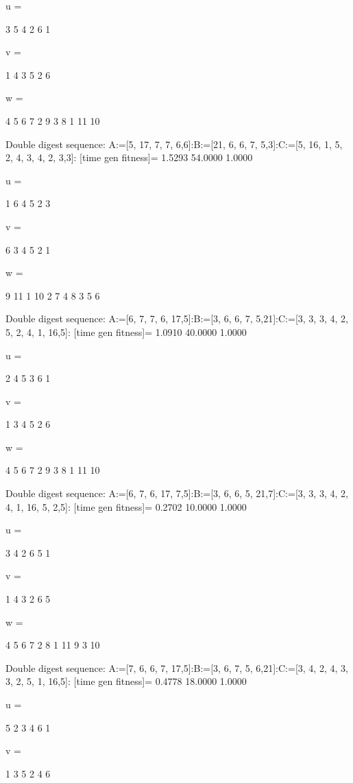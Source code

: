 u =

     3     5     4     2     6     1


v =

     1     4     3     5     2     6


w =

     4     5     6     7     2     9     3     8     1    11    10

Double digest sequence:
A:=[5, 17, 7, 7, 6,6]:B:=[21, 6, 6, 7, 5,3]:C:=[5, 16, 1, 5, 2, 4, 3, 4, 2, 3,3]:
[time gen fitness]=
    1.5293   54.0000    1.0000


u =

     1     6     4     5     2     3


v =

     6     3     4     5     2     1


w =

     9    11     1    10     2     7     4     8     3     5     6

Double digest sequence:
A:=[6, 7, 7, 6, 17,5]:B:=[3, 6, 6, 7, 5,21]:C:=[3, 3, 3, 4, 2, 5, 2, 4, 1, 16,5]:
[time gen fitness]=
    1.0910   40.0000    1.0000


u =

     2     4     5     3     6     1


v =

     1     3     4     5     2     6


w =

     4     5     6     7     2     9     3     8     1    11    10

Double digest sequence:
A:=[6, 7, 6, 17, 7,5]:B:=[3, 6, 6, 5, 21,7]:C:=[3, 3, 3, 4, 2, 4, 1, 16, 5, 2,5]:
[time gen fitness]=
    0.2702   10.0000    1.0000


u =

     3     4     2     6     5     1


v =

     1     4     3     2     6     5


w =

     4     5     6     7     2     8     1    11     9     3    10

Double digest sequence:
A:=[7, 6, 6, 7, 17,5]:B:=[3, 6, 7, 5, 6,21]:C:=[3, 4, 2, 4, 3, 3, 2, 5, 1, 16,5]:
[time gen fitness]=
    0.4778   18.0000    1.0000


u =

     5     2     3     4     6     1


v =

     1     3     5     2     4     6


